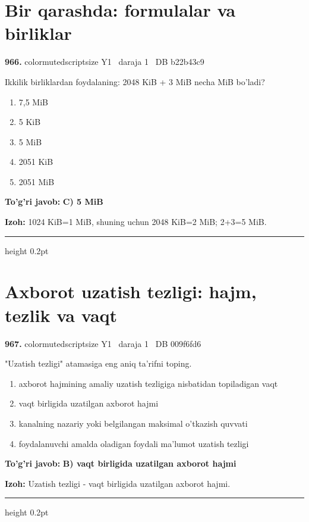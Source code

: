 \documentclass[10pt,a4paper,oneside]{article}
\begin{document}
\section{Bir qarashda: formulalar va birliklar}

\noindent\textbf{\color{ink}966.}  {color{muted}scriptsize Y1 \textbullet\ daraja 1 \textbullet\ DB b22b43c9}
\par
Ikkilik birliklardan foydalaning: 2048 KiB + 3 MiB necha MiB bo'ladi?
\begin{enumerate}[label=\Alph*),leftmargin=9mm]
\item 7,5 MiB
\item 5 KiB
\item 5 MiB
\item 2051 KiB
\item 2051 MiB
\end{enumerate}
\begin{tcolorbox}[enhanced,breakable,colback=teal!4,colframe=teal!50!black,boxrule=0.5pt,arc=1.1mm,left=3mm,right=3mm,top=1.7mm,bottom=1.7mm,before skip=2mm,after skip=2mm]
\textbf{\color{teal}To'g'ri javob:} \textbf{C) 5 MiB}
\par\smallskip
\textbf{Izoh:} 1024 KiB=1 MiB, shuning uchun 2048 KiB=2 MiB; 2+3=5 MiB.
\end{tcolorbox}
\vspace{2mm}\hrule height 0.2pt \vspace{3mm}
\section{Axborot uzatish tezligi: hajm, tezlik va vaqt}

\noindent\textbf{\color{ink}967.}  {color{muted}scriptsize Y1 \textbullet\ daraja 1 \textbullet\ DB 009f6fd6}
\par
"Uzatish tezligi" atamasiga eng aniq ta'rifni toping.
\begin{enumerate}[label=\Alph*),leftmargin=9mm]
\item axborot hajmining amaliy uzatish tezligiga nisbatidan topiladigan vaqt
\item vaqt birligida uzatilgan axborot hajmi
\item kanalning nazariy yoki belgilangan maksimal o'tkazish quvvati
\item foydalanuvchi amalda oladigan foydali ma'lumot uzatish tezligi
\end{enumerate}
\begin{tcolorbox}[enhanced,breakable,colback=teal!4,colframe=teal!50!black,boxrule=0.5pt,arc=1.1mm,left=3mm,right=3mm,top=1.7mm,bottom=1.7mm,before skip=2mm,after skip=2mm]
\textbf{\color{teal}To'g'ri javob:} \textbf{B) vaqt birligida uzatilgan axborot hajmi}
\par\smallskip
\textbf{Izoh:} Uzatish tezligi - vaqt birligida uzatilgan axborot hajmi.
\end{tcolorbox}
\vspace{2mm}\hrule height 0.2pt \vspace{3mm}
\end{document}

